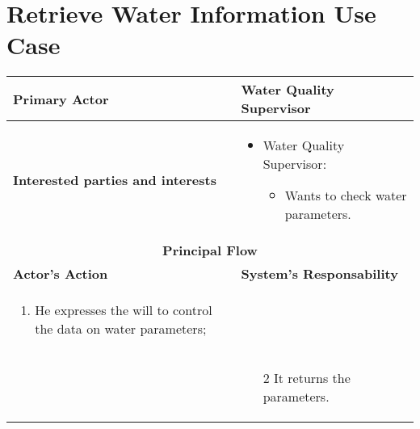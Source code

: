 \section{Retrieve Water Information Use Case}

\begin{longtable}{|p{7cm}|p{7cm}|}

\hline
\textbf{Primary Actor} & Water Quality Supervisor

\\


\hline
\textbf{Interested parties and interests} &
\begin{itemize}
\item Water Quality Supervisor:
	\begin{itemize}
 	\item Wants to check water parameters.
	\end{itemize}
\end{itemize}
\\


\hline
\multicolumn{2}{|c|}{\textbf{Principal Flow}} \\

\hline
\textbf{Actor's Action} & \textbf{System's Responsability}\\

\hline

\begin{enumerate}
\item He expresses the will to control the data on water parameters;
\end{enumerate} &\\

& 
\begin{enumerate}
\item[2]It returns the parameters.
\end{enumerate}\\

\hline
\end{longtable}